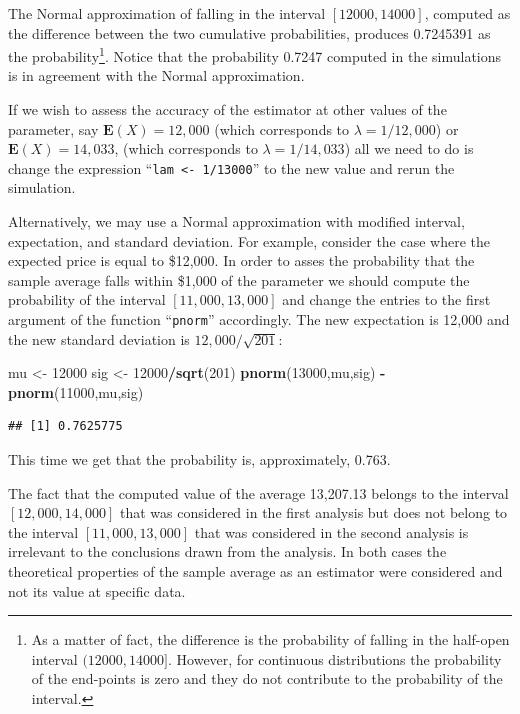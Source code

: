 \documentclass[
]{krantz}
\makeatletter
\newenvironment{Shaded}{\begin{snugshade}}{\end{snugshade}}
\newcommand{\DecValTok}[1]{\textcolor[rgb]{0.00,0.00,0.81}{#1}}
\newcommand{\KeywordTok}[1]{\textcolor[rgb]{0.13,0.29,0.53}{\textbf{#1}}}
\newcommand{\NormalTok}[1]{#1}
\newcommand{\OperatorTok}[1]{\textcolor[rgb]{0.81,0.36,0.00}{\textbf{#1}}}
\newcommand{\StringTok}[1]{\textcolor[rgb]{0.31,0.60,0.02}{#1}}
\newcommand{\Expec}{\mathbf{E}}
\newenvironment{kframe}{%
\medskip{}
\setlength{\fboxsep}{.8em}
 \def\at@end@of@kframe{}%
 \ifinner\ifhmode%
  \def\at@end@of@kframe{\end{minipage}}%
  \begin{minipage}{\columnwidth}%
 \fi\fi%
 \def\FrameCommand##1{\hskip\@totalleftmargin \hskip-\fboxsep
 \colorbox{shadecolor}{##1}\hskip-\fboxsep
     \hskip-\linewidth \hskip-\@totalleftmargin \hskip\columnwidth}%
 \MakeFramed {\advance\hsize-\width
   \@totalleftmargin\z@ \linewidth\hsize
   \@setminipage}}%
 {\par\unskip\endMakeFramed%
 \at@end@of@kframe}
\renewenvironment{Shaded}{\begin{kframe}}{\end{kframe}}
\theoremstyle{definition}
\theoremstyle{definition}
\theoremstyle{definition}
\theoremstyle{remark}
\makeatother
\begin{document}
The Normal approximation of falling in the interval \([12000, 14000]\),
computed as the difference between the two cumulative probabilities,
produces 0.7245391 as the probability\footnote{As a matter of fact, the difference is the probability of falling
  in the half-open interval \((12000,14000]\). However, for continuous
  distributions the probability of the end-points is zero and they do
  not contribute to the probability of the interval.}. Notice that the probability
0.7247 computed in the simulations is in agreement with the Normal
approximation.

If we wish to assess the accuracy of the estimator at other values of
the parameter, say \(\Expec(X) = 12,000\) (which corresponds to
\(\lambda = 1/12,000\)) or \(\Expec(X) = 14,033\), (which corresponds to
\(\lambda = 1/14,033\)) all we need to do is change the expression
``\texttt{lam\ \textless{}-\ 1/13000}'' to the new value and rerun the simulation.

Alternatively, we may use a Normal approximation with modified interval,
expectation, and standard deviation. For example, consider the case
where the expected price is equal to \$12,000. In order to asses the
probability that the sample average falls within \$1,000 of the
parameter we should compute the probability of the interval
\([11,000, 13,000]\) and change the entries to the first argument of the
function ``\texttt{pnorm}'' accordingly. The new expectation is 12,000 and the
new standard deviation is \(12,000/\sqrt{201}\):

\begin{Shaded}
\begin{Highlighting}[]
\NormalTok{mu <-}\StringTok{ }\DecValTok{12000}
\NormalTok{sig <-}\StringTok{ }\DecValTok{12000}\OperatorTok{/}\KeywordTok{sqrt}\NormalTok{(}\DecValTok{201}\NormalTok{)}
\KeywordTok{pnorm}\NormalTok{(}\DecValTok{13000}\NormalTok{,mu,sig) }\OperatorTok{-}\StringTok{ }\KeywordTok{pnorm}\NormalTok{(}\DecValTok{11000}\NormalTok{,mu,sig)}
\end{Highlighting}
\end{Shaded}

\begin{verbatim}
## [1] 0.7625775
\end{verbatim}

This time we get that the probability is, approximately, 0.763.

The fact that the computed value of the average 13,207.13 belongs to the
interval \([12,000, 14,000]\) that was considered in the first analysis
but does not belong to the interval \([11,000, 13,000]\) that was
considered in the second analysis is irrelevant to the conclusions drawn
from the analysis. In both cases the theoretical properties of the
sample average as an estimator were considered and not its value at
specific data.
\end{document}
